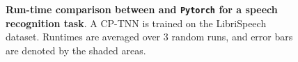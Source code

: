 \begin{figure}[!htbp]
\vspace{-1em}
\begin{minipage}[b]{.5\linewidth}
\centering
\resizebox{\textwidth}{!}{
   
    }
\label{fig:speech-rcp-vs-pytorch-train}
\end{minipage}%
\hfill
\begin{minipage}[b]{.5\linewidth}
\centering
\resizebox{\textwidth}{!}{
    
    }
\label{fig:speech-rcp-vs-pytorch-test}
\end{minipage}
\vspace{-2em}
\caption{\textbf{Run-time comparison between \conveinsum and \texttt{Pytorch} for a speech recognition task}. A CP-TNN is trained on the LibriSpeech dataset. Runtimes are averaged over 3 random runs, and error bars are denoted by the shaded areas.}\label{fig:speech-rcp-vs-pytorch}
\end{figure}